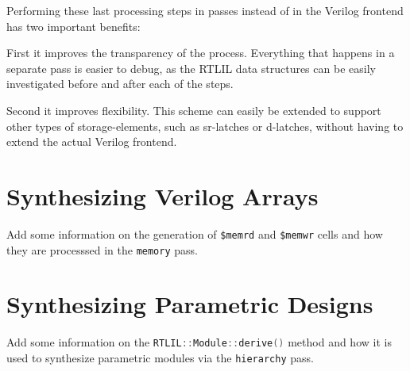Performing these last processing steps in passes instead of in the Verilog frontend has two important benefits:

First it improves the transparency of the process. Everything that happens in a separate pass is easier to debug,
as the RTLIL data structures can be easily investigated before and after each of the steps.

Second it improves flexibility. This scheme can easily be extended to support other types of storage-elements, such
as sr-latches or d-latches, without having to extend the actual Verilog frontend.

\section{Synthesizing Verilog Arrays}

\begin{fixme}
Add some information on the generation of {\tt \$memrd} and {\tt \$memwr} cells
and how they are processsed in the {\tt memory} pass.
\end{fixme}

\section{Synthesizing Parametric Designs}

\begin{fixme}
Add some information on the \lstinline[language=C++]{RTLIL::Module::derive()} method and how it
is used to synthesize parametric modules via the {\tt hierarchy} pass.
\end{fixme}

